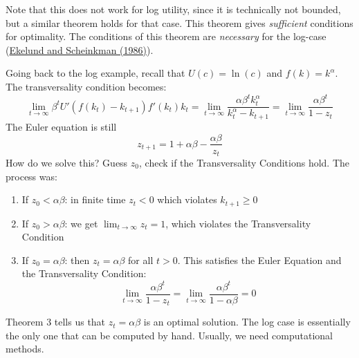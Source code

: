 \documentclass[10pt]{article}
\begin{document}
\begin{example}
\begin{enumerate}
		Note that this does not work for log utility, since it is technically not bounded, but a similar theorem holds for that case. This theorem gives \emph{sufficient} conditions for optimality. The conditions of this theorem are \emph{necessary} for the log-case (\href{https://www.jstor.org/stable/3689805}{Ekelund and Scheinkman (1986)}).
		
		Going back to the log example, recall that $U(c) = \ln(c)$ and $f(k) = k^\alpha$. The transversality condition becomes:
		\[
		\lim_{t\to\infty} \beta^t U'(f(k_t) - k_{t+1}) f'(k_t)k_t = \lim_{t\to\infty} \frac{\alpha \beta^t k_t^\alpha}{k_t^\alpha - k_{t+1}} = \lim_{t\to\infty} \frac{\alpha \beta^t}{1 - z_t}
		\]
		The Euler equation is still
		\[
		z_{t+1} = 1 + \alpha \beta - \frac{\alpha \beta}{z_t}
		\]
		How do we solve this? Guess $z_0$, check if the Transversality Conditions hold. The process was:
		\begin{enumerate}
			\item If $z_0 < \alpha \beta$: in finite time $z_t < 0$ which violates $k_{t+1} \ge 0$
			\item If $z_0 > \alpha \beta$: we get $\lim_{t\to\infty} z_t = 1$, which violates the Transversality Condition
			\item If $z_0 = \alpha \beta$: then $z_t = \alpha \beta$ for all $t > 0$. This satisfies the Euler Equation and the Transversality Condition:
			\[
			\lim_{t\to\infty} \frac{\alpha \beta^t}{1 - z_t} = \lim_{t\to\infty} \frac{\alpha\beta^t}{1 - \alpha \beta} = 0
			\]
		\end{enumerate}
		Theorem 3 tells us that $z_t = \alpha\beta$ is an optimal solution. The log case is essentially the only one that can be computed by hand. Usually, we need computational methods.
	\end{enumerate}
\end{example}
\end{document}
